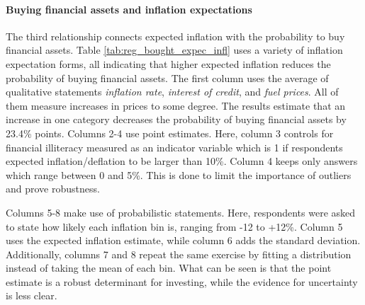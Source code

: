 \documentclass[ProjectABM]{subfiles}
\begin{document}


\paragraph{Buying financial assets and inflation expectations}
The third relationship connects expected inflation with the probability to buy financial assets. %
Table \ref{tab:reg_bought_expec_infl} uses a variety of inflation expectation forms, all indicating that higher expected inflation reduces the probability of buying financial assets. The first column uses the average of qualitative statements \textit{inflation rate}, \textit{interest of credit}, and \textit{fuel prices}. All of them measure increases in prices to some degree. The results estimate that an increase in one category decreases the probability of buying financial assets by 23.4\% points. Columns 2-4 use point estimates. Here, column 3 controls for financial illiteracy measured as an indicator variable which is 1 if respondents expected inflation/deflation to be larger than 10\%. Column 4 keeps only answers which range between 0 and 5\%. This is done to limit the importance of outliers and prove robustness.

Columns 5-8 make use of probabilistic statements. Here, respondents were asked to state how likely each inflation bin is, ranging from -12 to +12\%. Column 5 uses the expected inflation estimate, while column 6 adds the standard deviation. Additionally, columns 7 and 8 repeat the same exercise by fitting a distribution instead of taking the mean of each bin. What can be seen is that the point estimate is a robust determinant for investing, while the evidence for uncertainty is less clear. %
\end{document}
